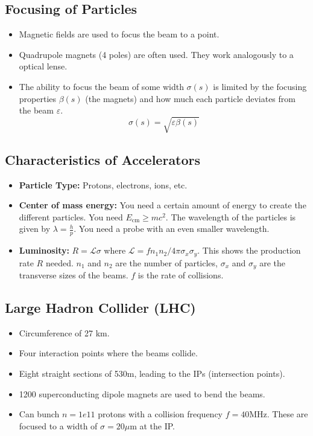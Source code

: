 \subsection{Focusing of Particles}
\begin{itemize}
    \item Magnetic fields are used to focus the beam to a point. 
    \item Quadrupole magnets (4 poles) are often used. They work analogously to a optical lense. 
    \item The ability to focus the beam of some width $σ(s)$ is limited by the focusing properties $β(s)$ (the magnets) and how much each particle deviates from the beam $ε$. 
    \begin{equation}
      σ(s) = \sqrt{εβ(s)}
    \end{equation}
\end{itemize}

\subsection{Characteristics of Accelerators}
\begin{itemize}
    \item \textbf{Particle Type:} Protons, electrons, ions, etc.
    \item \textbf{Center of mass energy:} You need a certain amount of energy to create the different particles. You need $E_{\text{cm}} ≥ mc^2$. The wavelength of the particles is given by $λ = \frac{h}{p}$. You need a probe with an even smaller wavelength. 
    \item \textbf{Luminosity:} $R = \mathcal{L}σ$ where $\mathcal{L} = f n_1n_2 / 4πσ_xσ_y$. This shows the production rate $R$ needed. $n_1$ and $n_2$ are the number of particles, $σ_x$ and $σ_y$ are the transverse sizes of the beams. $f$ is the rate of collisions. 
\end{itemize}

\subsection{Large Hadron Collider (LHC)}
\begin{itemize}
    \item Circumference of 27 km.
    \item Four interaction points where the beams collide.
    \item Eight straight sections of 530m, leading to the IPs (intersection points). 
    \item 1200 superconducting dipole magnets are used to bend the beams.
    \item Can bunch $n = 1e 11$ protons with a collision frequency $f = 40$MHz. These are focused to a width of $σ = 20μ$m at the IP.
\end{itemize}

